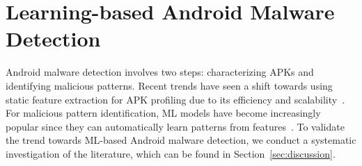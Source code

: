 \section{Learning-based Android Malware Detection}
\label{sec:systematic_investigation}
Android malware detection involves two steps: characterizing APKs and identifying malicious patterns.
Recent trends have seen a shift towards using static feature extraction for APK profiling due to its efficiency and scalability~\cite{qiu2020survey,liu2022deep}.
For malicious pattern identification, ML models have become increasingly popular since they can automatically learn patterns from features~\cite{wu2019malscan,mclaughlin2017deep,li2021robust}.
To validate the trend towards ML-based Android malware detection, we conduct a systematic investigation of the literature, which can be found in Section~\ref{sec:discussion}.

